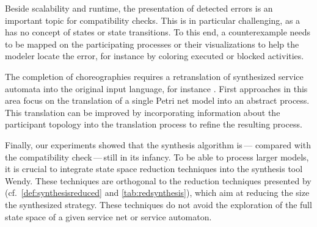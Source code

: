 Beside scalability and runtime, the presentation of detected errors is an important topic for compatibility checks. This is in particular challenging, as a  has no concept of states or state transitions. To this end, a counterexample needs to be mapped on the participating  processes or their  visualizations to help the modeler locate the error, for instance by coloring executed or blocked activities.

The completion of choreographies requires a retranslation of synthesized service automata into the original input language, for instance . First approaches in this area \cite{LassenA_2006_otm,AalstL_2008_ist,LohmannK_2008_mod} focus on the translation of a single Petri net model into an abstract  process. This translation can be improved by incorporating information about the participant topology into the translation process to refine the resulting  process.

Finally, our experiments showed that the synthesis algorithm is\,--- compared with the compatibility check\,---\,still in its infancy. To be able to process larger models, it is crucial to integrate state space reduction techniques into the synthesis tool Wendy. These techniques are orthogonal to the reduction techniques presented by \citet{Weinberg_2008_wsfm} (cf.~\autoref{def:synthesisreduced} and \autoref{tab:redsynthesis}), which aim at reducing the size the synthesized strategy. These techniques do not avoid the exploration of the full state space of a given service net or service automaton.
